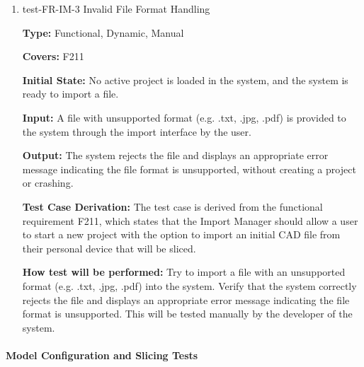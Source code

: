 \documentclass[12pt, titlepage]{article}
\begin{document}
\begin{enumerate}
\textbf{Test Case Derivation:} The test case is derived from the functional requirement F212, which states that the Import Manager should allow a user to import a past project file in order to reopen a project with all magnetization and material properties preserved.
					
\textbf{How test will be performed:} Open a previously saved project containing magnetization and material properties on the system. Verify that the system correctly loads the project and all of the magnetization and material properties are preserved. The model should be ready for further editing and visualization. This will be tested manually by the developer of the system.

\item{test-FR-IM-3 Invalid File Format Handling\\}
\label{sec:t-im-3}

\textbf{Type:} Functional, Dynamic, Manual

\textbf{Covers:} F211
					
\textbf{Initial State:} No active project is loaded in the system, and the system is ready to import a file.
					
\textbf{Input:} A file with unsupported format (e.g. .txt, .jpg, .pdf) is provided to the system through the import interface by the user.
					
\textbf{Output:} The system rejects the file and displays an appropriate error message indicating the file format is unsupported, without creating a project or crashing.

\textbf{Test Case Derivation:} The test case is derived from the functional requirement F211, which states that the Import Manager should allow a user to start a new project with the option to import an initial CAD file from their personal device that will be sliced. 
					
\textbf{How test will be performed:} Try to import a file with an unsupported format (e.g. .txt, .jpg, .pdf) into the system. Verify that the system correctly rejects the file and displays an appropriate error message indicating the file format is unsupported. This will be tested manually by the developer of the system.

\end{enumerate}

\paragraph{Model Configuration and Slicing Tests}
\end{document}
